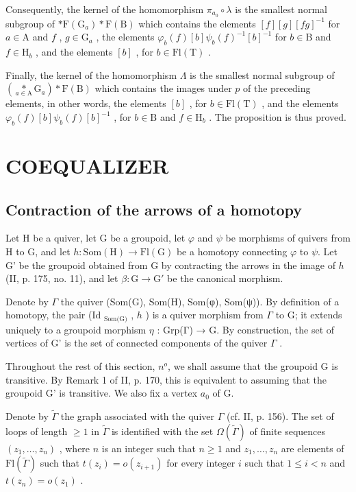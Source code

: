 Consequently, the kernel of the homomorphism \(\pi_{a_0} \circ \lambda\) is the smallest normal subgroup of \(*\mathrm{F}(\mathrm{G}_a) * \mathrm{F}(\mathrm{B})\) which contains the elements \([f][g][fg]^{-1}\) for \(a \in \mathrm{A}\) and \(f\) , \(g \in \mathrm{G}_a\) , the elements \(\varphi_b(f)[b]\psi_b(f)^{-1}[b]^{-1}\) for \(b \in \mathrm{B}\) and \(f \in \mathrm{H}_b\) , and the elements \([b]\) , for \(b \in \mathrm{Fl}(\mathrm{T})\) .

Finally, the kernel of the homomorphism \(\Lambda\) is the smallest normal subgroup of \((\underset{a\in\mathrm{A}}{*}\mathrm{G}_{a})*\mathrm{F}(\mathrm{B})\) which contains the images under \(p\) of the preceding elements, in other words, the elements \([b]\) , for \(b\in\mathrm{Fl}(\mathrm{T})\) , and the elements \(\varphi_{b}(f)[b]\psi_{b}(f)[b]^{-1}\) , for \(b\in\mathrm{B}\) and \(f\in\mathrm{H}_{b}\) . The proposition is thus proved.

\section{COEQUALIZER}

\subsection{Contraction of the arrows of a homotopy}

Let H be a quiver, let G be a groupoid, let \(\varphi\) and \(\psi\) be morphisms of quivers from H to G, and let \(h\colon \mathrm{Som}(\mathrm{H})\to \mathrm{Fl}(\mathrm{G})\) be a homotopy connecting \(\varphi\) to \(\psi\). Let G' be the groupoid obtained from G by contracting the arrows in the image of \(h\) (II, p. 175, no. 11), and let \(\beta\colon\mathrm{G}\to\mathrm{G}'\) be the canonical morphism.

Denote by \(\Gamma\) the quiver (Som(G), Som(H), Som(φ), Som(ψ)). By definition of a homotopy, the pair (Id \(_{\text{Som(G)}}\) , \(h\) ) is a quiver morphism from \(\Gamma\) to G; it extends uniquely to a groupoid morphism \(\eta\) : Grp(Γ) → G. By construction, the set of vertices of G' is the set of connected components of the quiver \(\Gamma\) .

Throughout the rest of this section, \(n^{o}\), we shall assume that the groupoid G is transitive. By Remark 1 of II, p. 170, this is equivalent to assuming that the groupoid G' is transitive. We also fix a vertex \(a_{0}\) of G.

Denote by \(\widetilde{\Gamma}\) the graph associated with the quiver \(\Gamma\) (cf. II, p. 156). The set of loops of length \(\geqslant 1\) in \(\widetilde{\Gamma}\) is identified with the set \(\Omega(\widetilde{\Gamma})\) of finite sequences \((z_1, \ldots, z_n)\) , where \(n\) is an integer such that \(n \geqslant 1\) and \(z_1, \ldots, z_n\) are elements of \(\mathrm{Fl}(\widetilde{\Gamma})\) such that \(t(z_i) = o(z_{i+1})\) for every integer \(i\) such that \(1 \leqslant i < n\) and \(t(z_n) = o(z_1)\) .

